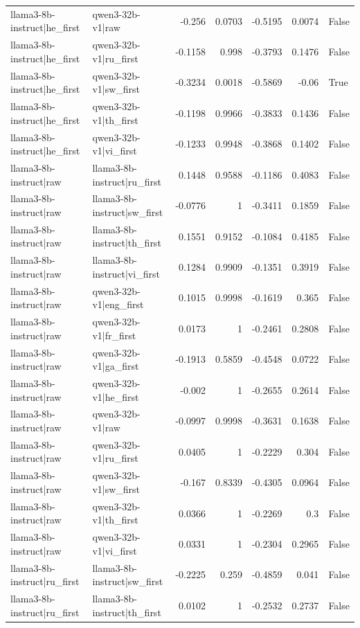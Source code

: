 \begin{table}
\begin{tabular}{l l r r r r l}
llama3-8b-instruct|he_first & qwen3-32b-v1|raw & -0.256 & 0.0703 & -0.5195 & 0.0074 & False \\
llama3-8b-instruct|he_first & qwen3-32b-v1|ru_first & -0.1158 & 0.998 & -0.3793 & 0.1476 & False \\
llama3-8b-instruct|he_first & qwen3-32b-v1|sw_first & -0.3234 & 0.0018 & -0.5869 & -0.06 & True \\
llama3-8b-instruct|he_first & qwen3-32b-v1|th_first & -0.1198 & 0.9966 & -0.3833 & 0.1436 & False \\
llama3-8b-instruct|he_first & qwen3-32b-v1|vi_first & -0.1233 & 0.9948 & -0.3868 & 0.1402 & False \\
llama3-8b-instruct|raw & llama3-8b-instruct|ru_first & 0.1448 & 0.9588 & -0.1186 & 0.4083 & False \\
llama3-8b-instruct|raw & llama3-8b-instruct|sw_first & -0.0776 & 1 & -0.3411 & 0.1859 & False \\
llama3-8b-instruct|raw & llama3-8b-instruct|th_first & 0.1551 & 0.9152 & -0.1084 & 0.4185 & False \\
llama3-8b-instruct|raw & llama3-8b-instruct|vi_first & 0.1284 & 0.9909 & -0.1351 & 0.3919 & False \\
llama3-8b-instruct|raw & qwen3-32b-v1|eng_first & 0.1015 & 0.9998 & -0.1619 & 0.365 & False \\
llama3-8b-instruct|raw & qwen3-32b-v1|fr_first & 0.0173 & 1 & -0.2461 & 0.2808 & False \\
llama3-8b-instruct|raw & qwen3-32b-v1|ga_first & -0.1913 & 0.5859 & -0.4548 & 0.0722 & False \\
llama3-8b-instruct|raw & qwen3-32b-v1|he_first & -0.002 & 1 & -0.2655 & 0.2614 & False \\
llama3-8b-instruct|raw & qwen3-32b-v1|raw & -0.0997 & 0.9998 & -0.3631 & 0.1638 & False \\
llama3-8b-instruct|raw & qwen3-32b-v1|ru_first & 0.0405 & 1 & -0.2229 & 0.304 & False \\
llama3-8b-instruct|raw & qwen3-32b-v1|sw_first & -0.167 & 0.8339 & -0.4305 & 0.0964 & False \\
llama3-8b-instruct|raw & qwen3-32b-v1|th_first & 0.0366 & 1 & -0.2269 & 0.3 & False \\
llama3-8b-instruct|raw & qwen3-32b-v1|vi_first & 0.0331 & 1 & -0.2304 & 0.2965 & False \\
llama3-8b-instruct|ru_first & llama3-8b-instruct|sw_first & -0.2225 & 0.259 & -0.4859 & 0.041 & False \\
llama3-8b-instruct|ru_first & llama3-8b-instruct|th_first & 0.0102 & 1 & -0.2532 & 0.2737 & False \\

\end{tabular}
\end{table}
